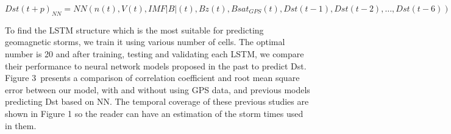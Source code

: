\begin{equation}\label{eq:dstmodel}
 Dst \left( t+p \right)_{NN} = NN \left( n \left( t \right) , V \left( t \right) , IMF \vert B \vert  \left( t \right) ,Bz \left( t \right) , Bsat_{GPS} \left( t \right) , Dst \left( t-1 \right) ,Dst \left( t-2 \right) , \ldots ,Dst \left( t-6 \right)  \right)
\end{equation}

To find the LSTM structure which is the most suitable for predicting geomagnetic storms, we train it 
using various number of cells. The optimal number is 20 and after training, testing and validating each 
LSTM, we compare their performance to neural network models proposed in the past to predict Dst. 
Figure 3\ presents a  comparison of correlation coefficient and root mean square error between our model, 
with and without using GPS data, and previous models predicting Dst based on NN. The temporal coverage of 
these previous studies are shown in Figure 1 so the reader can have an estimation of the storm times used in them. 



